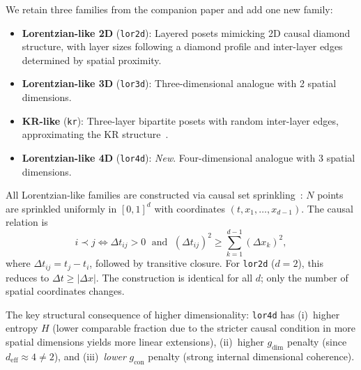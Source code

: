 \documentclass[entropy,article,submit,pdftex,moreauthors]{Definitions/mdpi}
\begin{document}
We retain three families from the companion paper and add one new family:

\begin{itemize}[nosep]
    \item \textbf{Lorentzian-like 2D} (\texttt{lor2d}): Layered posets mimicking 2D causal diamond structure, with layer sizes following a diamond profile and inter-layer edges determined by spatial proximity.
    \item \textbf{Lorentzian-like 3D} (\texttt{lor3d}): Three-dimensional analogue with 2 spatial dimensions.
    \item \textbf{KR-like} (\texttt{kr}): Three-layer bipartite posets with random inter-layer edges, approximating the KR structure~\cite{kleitman1975}.
    \item \textbf{Lorentzian-like 4D} (\texttt{lor4d}): \emph{New}. Four-dimensional analogue with 3 spatial dimensions.
\end{itemize}

All Lorentzian-like families are constructed via causal set sprinkling~\cite{bombelli1987}: $N$ points are sprinkled uniformly in $[0,1]^d$ with coordinates $(t, x_1, \ldots, x_{d-1})$. The causal relation is
\begin{equation}
    i \prec j \iff \Delta t_{ij} > 0 \;\text{ and }\; (\Delta t_{ij})^2 \geq \sum_{k=1}^{d-1} (\Delta x_k)^2,
    \label{eq:causal}
\end{equation}
where $\Delta t_{ij} = t_j - t_i$, followed by transitive closure. For \texttt{lor2d} ($d = 2$), this reduces to $\Delta t \geq |\Delta x|$. The construction is identical for all $d$; only the number of spatial coordinates changes.

The key structural consequence of higher dimensionality: \texttt{lor4d} has (i)~higher entropy $H$ (lower comparable fraction due to the stricter causal condition in more spatial dimensions yields more linear extensions), (ii)~higher $g_{\text{dim}}$ penalty (since $d_{\text{eff}} \approx 4 \neq 2$), and (iii)~\emph{lower} $g_{\text{con}}$ penalty (strong internal dimensional coherence).
\end{document}
